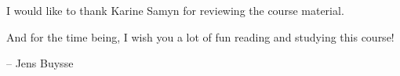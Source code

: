 I would like to thank Karine Samyn for reviewing the course material. 

And for the time being, I wish you a lot of fun reading and studying this course!

\begin{flushright}
	-- Jens Buysse
\end{flushright}